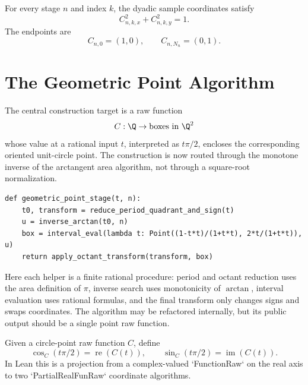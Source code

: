 \begin{theorem}
\label{thm:dyadic-trig-samples}
\leanok
For every stage \(n\) and index \(k\), the dyadic sample coordinates satisfy
\[
  C_{n,k,x}^2+C_{n,k,y}^2=1.
\]
The endpoints are
\[
  C_{n,0}=(1,0),
  \qquad
  C_{n,N_n}=(0,1).
\]
\end{theorem}

\section{The Geometric Point Algorithm}

\begin{definition}
\label{def:geometric-point-functionraw}
The central construction target is a raw function
\[
  C : \Q \to \hbox{boxes in }\Q^2
\]
whose value at a rational input \(t\), interpreted as \(t\pi/2\), encloses the
corresponding oriented unit-circle point.  The construction is now routed
through the monotone inverse of the arctangent area algorithm, not through a
square-root normalization.
\begin{verbatim}
def geometric_point_stage(t, n):
    t0, transform = reduce_period_quadrant_and_sign(t)
    u = inverse_arctan(t0, n)
    box = interval_eval(lambda t: Point((1-t*t)/(1+t*t), 2*t/(1+t*t)), u)
    return apply_octant_transform(transform, box)
\end{verbatim}
Here each helper is a finite rational procedure: period and octant reduction
uses the area definition of \(\pi\), inverse search uses monotonicity of
\(\arctan\), interval evaluation uses rational formulas, and the final
transform only changes signs and swaps coordinates.  The algorithm may be
refactored internally, but its public output should be a single point raw
function.
\end{definition}

\begin{definition}
\label{def:geometric-sin-cos-functionraw}
\leanok
Given a circle-point raw function \(C\), define
\[
  \cos_C(t\pi/2)=\operatorname{re}(C(t)),
  \qquad
  \sin_C(t\pi/2)=\operatorname{im}(C(t)).
\]
In Lean this is a projection from a complex-valued `FunctionRaw` on the real
axis to two `PartialRealFunRaw` coordinate algorithms.
\end{definition}

